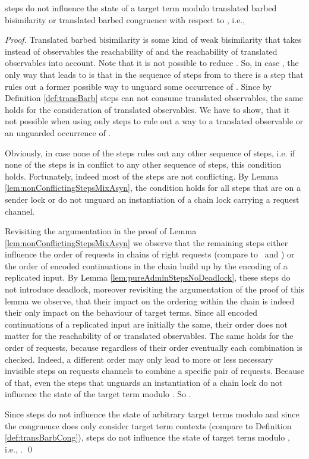 \documentclass[]{llncs}
\begin{document}
\begin{lemma} \label{lem:pureAdminStepsTransBarbBisimMixAsyn}
	\Pure \admin steps do not influence the state of a target term modulo translated barbed bisimilarity or translated barbed congruence with respect to , i.e.,
	
\end{lemma}

\begin{proof}
	Translated barbed bisimilarity is some kind of weak bisimilarity that takes instead of observables the reachability of  and the reachability of translated observables into account. Note that it is not possible to reduce . So, in case , the only way that leads to  is that in the sequence of steps from  to  there is a step that rules out a former possible way to unguard some occurrence of . Since by Definition \ref{def:transBarb} \pure \admin steps can not consume translated observables, the same holds for the consideration of translated observables. We have to show, that it not possible when using only \pure \admin steps to rule out a way to a translated observable or an unguarded occurrence of .
	
	Obviously, in case none of the \pure \admin steps rules out any other sequence of steps, i.e. if none of the \pure \admin steps is in conflict to any other sequence of steps, this condition holds. Fortunately, indeed most of the \pure \admin steps are not conflicting. By Lemma \ref{lem:nonConflictingStepsMixAsyn}, the condition  holds for all steps that are on a sender lock or do not unguard an instantiation of a chain lock carrying a request channel.
	
	Revisiting the argumentation in the proof of Lemma \ref{lem:nonConflictingStepsMixAsyn} we observe that the remaining steps either influence the order of requests in chains of right requests (compare to \processRightOutputRequests \ and \processRightInputRequests) or the order of encoded continuations in the chain build up by the encoding of a replicated input. By Lemma \ref{lem:pureAdminStepsNoDeadlock}, these steps do not introduce deadlock, moreover revisiting the argumentation of the proof of this lemma we observe, that their impact on the ordering within the chain is indeed their only impact on the behaviour of target terms. Since all encoded continuations of a replicated input are initially the same, their order does not matter for the reachability of  or translated observables. The same holds for the order of requests, because regardless of their order eventually each combination is checked. Indeed, a different order may only lead to more or less necessary invisible steps on requests channels to combine a specific pair of requests. Because of that, even the \pure \admin steps that unguards an instantiation of a chain lock do not influence the state of the target term modulo . So .
	
	Since \pure \admin steps do not influence the state of arbitrary target terms modulo  and since the congruence  does only consider target term contexts (compare to Definition \ref{def:transBarbCong}), \pure \admin steps do not influence the state of target terns modulo , i.e., .
	\qed
\end{proof}
\end{document}
